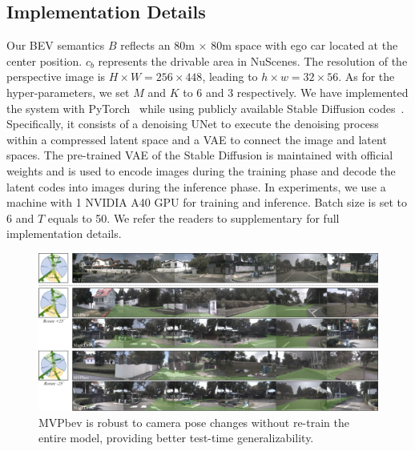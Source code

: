 \subsection{Implementation Details}
Our BEV semantics $\textit{B}$ reflects an 80m $\times$ 80m space with ego car located at the center position. $c_b$ represents the drivable area in NuScenes. The resolution of the perspective image is $H\times W = 256\times 448$, leading to $h\times w = 32\times56$. As for the hyper-parameters, we set $M$ and $K$ to 6 and 3 respectively. We have implemented the system with PyTorch~\cite{paszke2019pytorch} while using publicly available Stable Diffusion codes~\cite{von-platen-etal-2022-diffusers}. Specifically, it consists of a denoising UNet to execute the denoising process within a compressed latent space and a VAE to connect the image and latent spaces. The pre-trained VAE of the Stable Diffusion is maintained with official weights and is used to encode images during the training phase and decode the latent codes into images during the inference phase. In experiments, we use a machine with 1 NVIDIA A40 GPU for training and inference. Batch size is set to 6 and $T$ equals to 50. We refer the readers to supplementary for full implementation details.


\begin{figure}[t]
\centering
\includegraphics[width=0.95\linewidth]{figures/camera_pose_demo_semantic_overlay.jpg}
\caption{MVPbev is robust to camera pose changes without re-train the entire model, providing better test-time generalizability.
}
\label{fig:view_point}
\end{figure}

